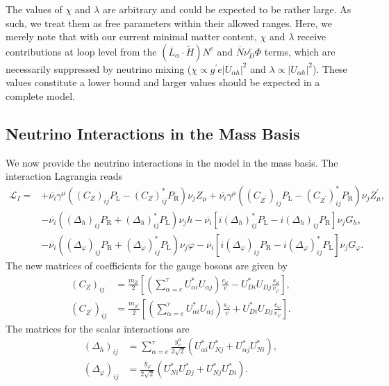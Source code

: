 The values of $\chi$ and $\lambda$ are arbitrary and could be expected to be rather large. As such, we treat them as free parameters within their allowed ranges. Here, we merely note that with our current minimal matter content, $\chi$ and $\lambda$ receive contributions at loop level from the $(\overline{L}_\alpha \cdot \widetilde{H})N^c$ and $\overline{N} \nu_D^c \Phi$ terms, which are necessarily suppressed by neutrino mixing ($\chi \propto g^\prime e |U_{\alpha h}|^2$ and $\lambda \propto |U_{\alpha h}|^2$). These values constitute a lower bound and larger values should be expected in a complete model.

\subsection{Neutrino Interactions in the Mass Basis}

We now provide the neutrino interactions in the model in the mass basis. The interaction Lagrangia reads
%
\begin{align}
%
\mathcal{L}_I = &+ \overline{\nu_i}\gamma^\mu\left((C_Z)_{ij}P_\text{L} - (C_Z)^*_{ij}P_\text{R}\right)\nu_j Z_\mu + \overline{\nu_i}\gamma^\mu\left((C_{Z^\prime})_{ij}P_\text{L} - (C_{Z^\prime})^*_{ij}P_\text{R}\right)\nu_j Z^\prime_\mu, \\
%
&- \overline{\nu_i}\left((\Delta_h)_{ij}P_\text{R} + (\Delta_h)^*_{ij}P_\text{L}\right)\nu_j h - \overline{\nu_i}\left[ i(\Delta_h)_{ij}^*P_\text{L} -i(\Delta_h)_{ij}P_\text{R}\right]\nu_j G_h, \\
%
&- \overline{\nu_i}\left((\Delta_\varphi)_{ij} P_\text{R} + (\Delta_\varphi)^*_{ij} P_\text{L} \right)\nu_j \varphi - \overline{\nu_i}\left[i(\Delta_\varphi)_{ij}P_\text{R} - i(\Delta_\varphi)_{ij}^*P_\text{L}\right]\nu_j G_\varphi.
%
\end{align}
%
The new matrices of coefficients for the gauge bosons are given by
%
\begin{align}
%
(C_Z)_{ij} &= \frac{m_Z}{2}\left[\left(\sum_{\alpha =e}^\tau U^*_{\alpha i}U_{\alpha j}\right)\frac{c_\omega }{v} - U^*_{Di}U_{Dj}\frac{s_\omega}{v_\varphi}\right], \\
(C_{Z^\prime})_{ij} &=\frac{m_{Z^\prime}}{2} \left[\left(\sum_{\alpha =e}^\tau U^*_{\alpha i}U_{\alpha j}\right)\frac{s_\omega}{v} + U^*_{Di}U_{Dj}\frac{c_\omega}{v_\varphi}\right].
\end{align}
%
The matrices for the scalar interactions are 
%
%
\begin{align}
%
(\Delta_h)_{ij} &=\sum_{\alpha=e}^\tau \frac{y^\alpha_\nu}{2\sqrt{2}}\left(U_{\alpha i}^*U_{Nj}^* + U_{\alpha j}^*U_{Ni}^*\right),\\
%
(\Delta_\varphi)_{ij} &= \frac{y_\varphi}{2\sqrt{2}}\left(U_{N i}^*U_{Dj}^* + U_{N j}^*U_{Di}^*\right).
%
\end{align}

